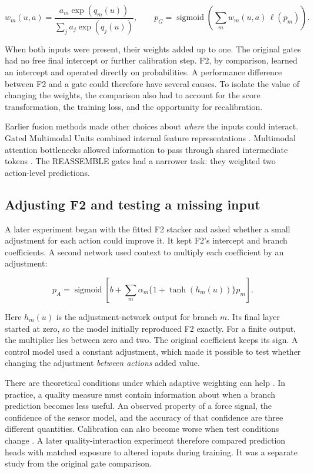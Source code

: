 \begin{equation}
w_m(u,a)=
\frac{a_m\exp(q_m(u))}
{\sum_j a_j\exp(q_j(u))},
\qquad
p_G=\operatorname{sigmoid}\!\left(\sum_m w_m(u,a)\,\ell(p_m)\right).
\label{eq:gate}
\end{equation}

When both inputs were present, their weights added up to one. The original gates had no free final intercept or further calibration step. F2, by comparison, learned an intercept and operated directly on probabilities. A performance difference between F2 and a gate could therefore have several causes. To isolate the value of changing the weights, the comparison also had to account for the score transformation, the training loss, and the opportunity for recalibration.

Earlier fusion methods made other choices about \textit{where} the inputs could interact. Gated Multimodal Units combined internal feature representations \parencite{P006}. Multimodal attention bottlenecks allowed information to pass through shared intermediate tokens \parencite{Nagrani2021MBT}. The REASSEMBLE gates had a narrower task: they weighted two action-level predictions.

\subsection{Adjusting F2 and testing a missing input}

A later experiment began with the fitted F2 stacker and asked whether a small adjustment for each action could improve it. It kept F2’s intercept and branch coefficients. A second network used context to multiply each coefficient by an adjustment:

\begin{equation}
p_A=\operatorname{sigmoid}\!\left[
b+\sum_m\alpha_m\{1+\tanh(h_m(u))\}p_m
\right].
\label{eq:anchored}
\end{equation}

Here \(h_m(u)\) is the adjustment-network output for branch \(m\). Its final layer started at zero, so the model initially reproduced F2 exactly. For a finite output, the multiplier lies between zero and two. The original coefficient keeps its sign. A control model used a constant adjustment, which made it possible to test whether changing the adjustment \textit{between actions} added value.

There are theoretical conditions under which adaptive weighting can help \parencite{Zhang2023QMF}. In practice, a quality measure must contain information about when a branch prediction becomes less useful. An observed property of a force signal, the confidence of the sensor model, and the accuracy of that confidence are three different quantities. Calibration can also become worse when test conditions change \parencite{P008}. A later quality-interaction experiment therefore compared prediction heads with matched exposure to altered inputs during training. It was a separate study from the original gate comparison.

